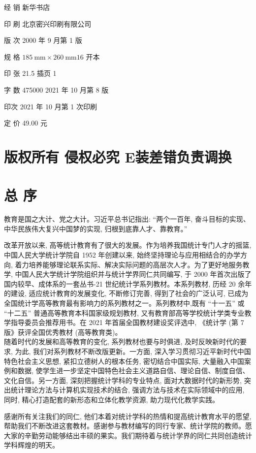 \documentclass[10pt]{article}
\begin{document}
\begin{CJK*}{UTF8}{bsmi}
经 销 新华书店

印 刷 北京密兴印刷有限公司

版 次 2000 年 9 月第 1 版

规 格 $185 \mathrm{~mm} \times 260 \mathrm{~mm} 16$ 开本

印 张 21.5 插页 1

字 数 475000 2021 年 10 月第 8 版

印次 2021 年 10 月第 1 次印刷

定 价 49.00 元

\section*{版权所有 侵权必究 E装差错负责调换}
\section*{总 序}
教育是国之大计、党之大计。习近平总书记指出: “两个一百年, 奋斗目标的实现、中华民族伟大复兴中国梦的实现, 归根到底靠人才、靠教育。”

改革开放以来, 高等统计教育有了很大的发展。作为培养我国统计专门人才的摇篮, 中国人民大学统计学院自 1952 年创建以来, 始终坚持理论与应用相结合的办学方向, 着力培养能够理论联系实际、解决实际问题的高层次人才。为了更好地服务教学, 中国人民大学统计学院组织并与统计学界同仁共同编写, 于 2000 年首次出版了国内较早、成体系的一套丛书-21 世纪统计学系列教材。本系列教材, 历经 20 余年的建设, 适应统计教育的发展变化, 不断修订完善, 得到了社会的广泛认可, 已成为全国统计学高等教育最有影响力的系列教材之一。系列教材中,既有 “十一五” 或 “十二五” 普通高等教育本科国家级规划教材, 又有教育部高等学校统计学类专业教学指导委员会推荐用书。在 2021 年首届全国教材建设奖评选中, 《统计学 (第 7 版》获评全国优秀教材 (高等教育类)。\\
随着时代的发展和高等教育的变化, 系列教材也要与时俱进, 及时反映新时代的要求, 为此, 我们对系列教材不断改版更新。一方面, 深入学习贯彻习近平新时代中国特色社会主义思想, 紧扣立德树人的根本任务, 密切结合中国实际, 大量融入中国案例和数据, 使学生进一步坚定中国特色社会主义道路自信、理论自信、制度自信、文化自信。另一方面, 深刻把握统计学科的专业特点, 面对大数据时代的新形势, 突出统计理论方法与计算机实现技术的结合, 强调方法与技术在实际领域中的应用, 同时, 精心打造配套的新形态和立体化教学资源, 助力现代化教学实践。

感谢所有关注我们的同仁, 他们本着对统计学科的热情和提高统计教育水平的愿望,帮助我们不断改进这套教材。感谢参与教材编写的同行专家、统计学院的教师。愿大家的辛勤劳动能够结出丰硕的果实。我们期待着与统计学界的同仁共同创造统计学科辉煌的明天。


\end{CJK*}
\end{document}
